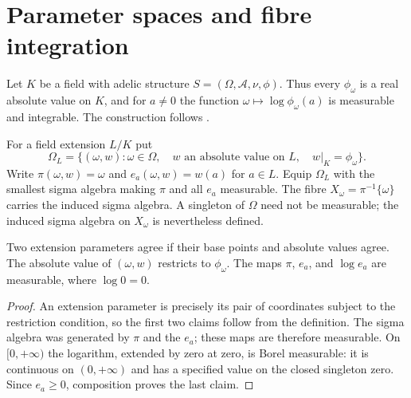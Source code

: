\section{Parameter spaces and fibre integration}

Let $K$ be a field with adelic structure $S=(\Omega,\mathcal A,\nu,\phi)$.
Thus every $\phi_\omega$ is a real absolute value on $K$, and for $a\ne0$
the function $\omega\mapsto\log\phi_\omega(a)$ is measurable and integrable.
The construction follows \cite[\S\S3.3--3.4]{chen-moriwaki}.

\begin{definition}\label{def:extension-parameters}
\leanok
{}
For a field extension $L/K$ put
\[
 \Omega_L=\{(\omega,w):\omega\in\Omega,\quad
 w\text{ an absolute value on }L,\quad w|_K=\phi_\omega\}.
\]
Write $\pi(\omega,w)=\omega$ and $e_a(\omega,w)=w(a)$ for $a\in L$.
Equip $\Omega_L$ with the smallest sigma algebra making $\pi$ and all $e_a$
measurable. The fibre $X_\omega=\pi^{-1}\{\omega\}$ carries the induced
sigma algebra. A singleton of $\Omega$ need not be measurable; the induced
sigma algebra on $X_\omega$ is nevertheless defined.
\end{definition}

\begin{lemma}\label{lem:extension-coordinates}
\leanok
{}
Two extension parameters agree if their base points and absolute values agree.
The absolute value of $(\omega,w)$ restricts to $\phi_\omega$.
The maps $\pi$, $e_a$, and $\log e_a$ are measurable, where $\log 0=0$.
\end{lemma}
\begin{proof}
An extension parameter is precisely its pair of coordinates subject to the
restriction condition, so the first two claims follow from the definition.
The sigma algebra was generated by $\pi$ and the $e_a$; these maps are
therefore measurable. On $[0,+\infty)$ the logarithm, extended by zero at
zero, is Borel measurable: it is continuous on $(0,+\infty)$ and has a
specified value on the closed singleton zero. Since $e_a\geq0$, composition
proves the last claim.
\end{proof}

